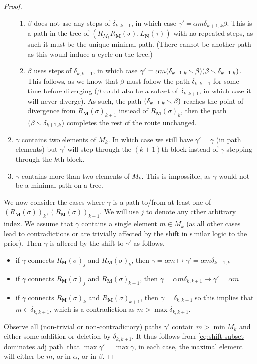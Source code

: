 \begin{proof}
\begin{enumerate}
\begin{enumerate}
        \item $\beta$ does not use any steps of $\delta_{k,k+1}$, in which case $\gamma' = \alpha m \delta_{k+1,k} \beta$.
        This is a path in the tree of $(R_{M_k}R_{\mathbf{M}}(\sigma),L_{\mathbf{N}}(\tau))$ with no repeated steps, as such it must be the unique minimal path. 
        (There cannot be another path as this would induce a cycle on the tree.)
        \item $\beta$ uses steps of $\delta_{k,k+1}$, in which case $\gamma' = \alpha m (\delta_{k+1,k}\smallsetminus \beta)(\beta \smallsetminus \delta_{k+1,k})$.
        This follows, as we know that $\beta$ must follow the path $\delta_{k,k+1}$ for some time before diverging ($\beta$ could also be a subset of $\delta_{k,k+1}$, in which case it will never diverge).
        As such, the path $(\delta_{k+1,k}\smallsetminus \beta)$ reaches the point of divergence from $R_{\mathbf{M}}(\sigma)_{k+1}$ instead of $R_{\mathbf{M}}(\sigma)_{k}$, then the path $(\beta \smallsetminus \delta_{k+1,k})$ completes the rest of the route unchanged.
    \end{enumerate}
    \item $\gamma$ contains two elements of $M_k$. In which case we still have $\gamma'=\gamma$ (in path elements) but $\gamma'$ will step through the $(k+1)$th block instead of $\gamma$ stepping through the $k$th block.
    
    \item $\gamma$ contains more than two elements of $M_k$. This is impossible, as $\gamma$ would not be a minimal path on a tree.
\end{enumerate}
We now consider the cases where $\gamma$ is a path to/from at least one of $(R_{\mathbf{M}}(\sigma))_k,(R_{\mathbf{M}}(\sigma))_{k+1}$.
We will use $j$ to denote any other arbitrary index.
We assume that $\gamma$ contains a single element $m\in M_k$ (as all other cases lead to contradictions or are trivially affected by the shift in similar logic to the prior).
Then $\gamma$ is altered by the shift to $\gamma'$ as follows,
\begin{itemize}
    \item if $\gamma$ connects $R_{\mathbf{M}}(\sigma)_j$ and $R_{\mathbf{M}}(\sigma)_k$, then $\gamma = \alpha m \mapsto \gamma' = \alpha m \delta_{k+1,k} $
    \item if $\gamma$ connects $R_{\mathbf{M}}(\sigma)_j$ and $R_{\mathbf{M}}(\sigma)_{k+1}$, then $\gamma = \alpha m \delta_{k,k+1} \mapsto \gamma' = \alpha m $
    \item if $\gamma$ connects $R_{\mathbf{M}}(\sigma)_k$ and $R_{\mathbf{M}}(\sigma)_{k+1}$, then $\gamma = \delta_{k,k+1}$ so this implies that $m\in \delta_{k,k+1}$, which is a contradiction as $m> \max \delta_{k,k+1}$.
\end{itemize}
Observe all (non-trivial or non-contradictory) paths $\gamma'$ contain $m>\min M_k$ and either some addition or deletion by $\delta_{k,k+1}$.
It thus follows from \cref{eq:shift subset dominates adj path} that $\max \gamma' = \max \gamma$, in each case, the maximal element will either be $m$, or in $\alpha$, or in $\beta$.
\end{proof}

